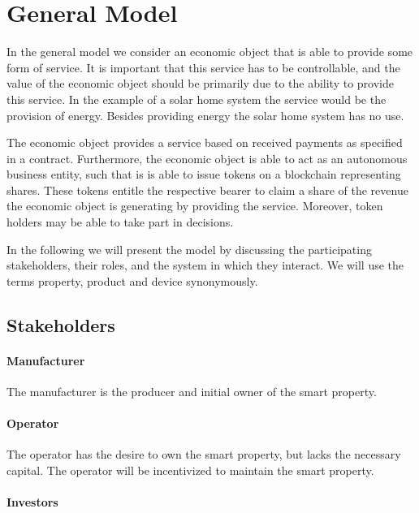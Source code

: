 \section{General Model}

In the general model we consider an economic object that is able to provide some form of service. It is important that this service has to be controllable, and the value of the economic object should be primarily due to the ability to provide this service.
In the example of a solar home system the service would be the provision of energy. Besides providing energy the solar home system has no use.

The economic object provides a service based on received payments as specified in a contract. Furthermore, the economic object is able to act as an autonomous business entity, such that is is able to issue tokens on a blockchain representing shares. These tokens entitle the respective bearer to claim a share of the revenue the economic object is generating by providing the service. Moreover, token holders may be able to take part in decisions. 




In the following we will present the model by discussing the participating stakeholders, their roles, and the system in which they interact. We will use the terms property, product and device synonymously. 

\subsection{Stakeholders}

\paragraph{Manufacturer}

The manufacturer is the producer and initial owner of the smart property.

\paragraph{Operator}

The operator has the desire to own the smart property, but lacks the necessary capital. The operator will be incentivized to maintain the smart property.

\paragraph{Investors}

